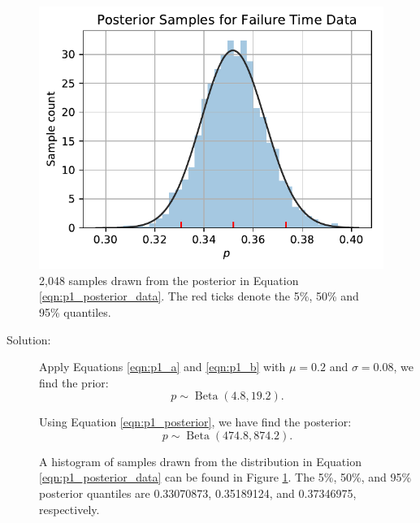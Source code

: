 \documentclass[letterpaper,11pt]{article}
\begin{document}
\begin{enumerate}
\begin{enumerate}
    \begin{figure}
      \centering
      \includegraphics{p1_posterior_samples.pdf}
      \caption{2,048 samples drawn from the posterior in Equation
        \ref{eqn:p1_posterior_data}. The red ticks denote the 5\%, 50\% and
        95\% quantiles.}
      \label{fig:p1_posterior_samples}
    \end{figure}
    
    \begin{description}
    \item[Solution:] Apply Equations \ref{eqn:p1_a} and \ref{eqn:p1_b} with
      $\mu = 0.2$ and $\sigma = 0.08$, we find the prior:
      \begin{equation}
        p \sim \operatorname{Beta}\left(4.8, 19.2\right).
        \label{eqn:p1_prior}
      \end{equation}

      Using Equation \ref{eqn:p1_posterior}, we have find the posterior:
      \begin{equation}
        p \sim \operatorname{Beta}\left(474.8, 874.2\right).
        \label{eqn:p1_posterior_data}
      \end{equation}
      
      A histogram of samples drawn from the distribution in Equation
      \ref{eqn:p1_posterior_data} can be found in Figure
      \ref{fig:p1_posterior_samples}. The 5\%, 50\%, and 95\% posterior
      quantiles are 0.33070873, 0.35189124, and 0.37346975, respectively.


\end{description}
\end{enumerate}
\end{enumerate}
\end{document}

